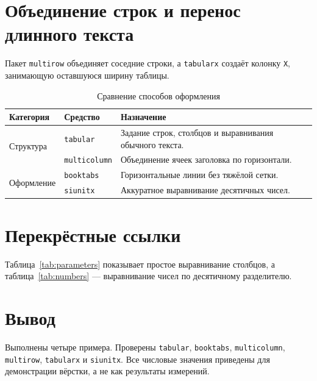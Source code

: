 \documentclass[a4paper,12pt]{article}
\begin{document}
\section{Объединение строк и перенос длинного текста}
Пакет \texttt{multirow} объединяет соседние строки, а \texttt{tabularx}
создаёт колонку \texttt{X}, занимающую оставшуюся ширину таблицы.
\begin{table}[htbp]
\centering
\caption{Сравнение способов оформления}
\label{tab:comparison}
\small
\begin{tabularx}{\textwidth}{@{}l l X@{}}
\toprule
Категория & Средство & Назначение\\
\midrule
\multirow{2}{*}{Структура} & \texttt{tabular} & Задание строк, столбцов и выравнивания обычного текста.\\
 & \texttt{multicolumn} & Объединение ячеек заголовка по горизонтали.\\
\midrule
\multirow{2}{*}{Оформление} & \texttt{booktabs} & Горизонтальные линии без тяжёлой сетки.\\
 & \texttt{siunitx} & Аккуратное выравнивание десятичных чисел.\\
\bottomrule
\end{tabularx}
\end{table}
\section{Перекрёстные ссылки}
Таблица~\ref{tab:parameters} показывает простое выравнивание столбцов,
а таблица~\ref{tab:numbers} --- выравнивание чисел по десятичному разделителю.
\section{Вывод}
Выполнены четыре примера. Проверены \texttt{tabular}, \texttt{booktabs},
\texttt{multicolumn}, \texttt{multirow}, \texttt{tabularx} и \texttt{siunitx}.
Все числовые значения приведены для демонстрации вёрстки,
а не как результаты измерений.
\end{document}
